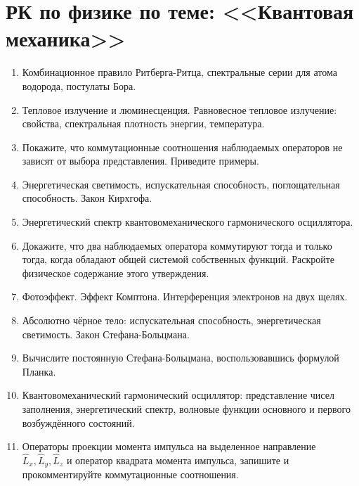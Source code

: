 \documentclass[12pt]{article}
\begin{document}
%
\section{РК по физике по теме: <<Квантовая механика>>}
%

\begin{enumerate}

\item\label{_1}
Комбинационное правило Ритберга-Ритца, спектральные серии для атома водорода, постулаты Бора.

\item\label{_2}
Тепловое излучение и люминесценция. Равновесное тепловое излучение: свойства, спектральная плотность энергии, температура.

\item\label{_3}
Покажите, что коммутационные соотношения наблюдаемых операторов не зависят от выбора представления. Приведите примеры.

\item\label{_4}
Энергетическая светимость, испускательная способность, поглощательная способность. Закон Кирхгофа.

\item\label{_5}
Энергетический спектр квантовомеханического гармонического осциллятора.

\item\label{_6}
Докажите, что два наблюдаемых оператора коммутируют тогда и только тогда, когда обладают общей системой собственных функций. Раскройте физическое содержание этого утверждения.

\item\label{_7}
Фотоэффект. Эффект Комптона. Интерференция электронов на двух щелях.

\item\label{_8}
Абсолютно чёрное тело: испускательная способность, энергетическая светимость. Закон Стефана-Больцмана.

\item\label{_9}
Вычислите постоянную Стефана-Больцмана, воспользовавшись формулой Планка.

\item\label{_10}
Квантовомеханический гармонический осциллятор: представление чисел заполнения, энергетический спектр, волновые функции основного и первого возбуждённого состояний.

\item\label{_11}
Операторы проекции момента импульса на выделенное направление $\hat{L}_x, \hat{L}_y, \hat{L}_z$ и оператор квадрата момента импульса, запишите и прокомментируйте коммутационные соотношения.


\end{enumerate}
\end{document}
